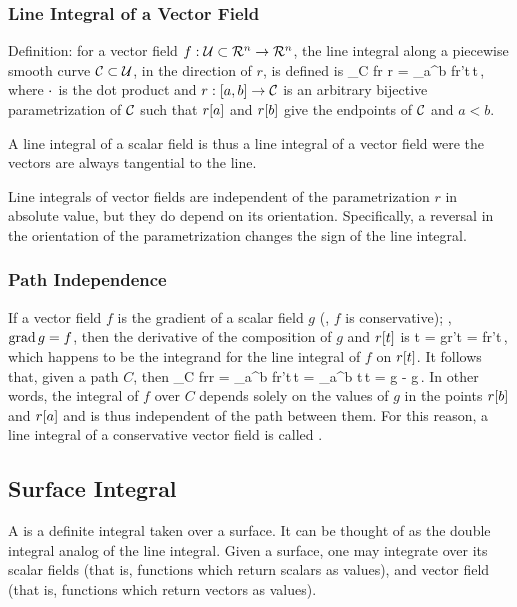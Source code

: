 \subsubsection{Line Integral of a Vector Field}
Definition: for a vector field ${f}:{\mathcal{U}\subset\mathcal{R}^{n}}\to{\mathcal{R}^{n}}$, the line integral along a piecewise smooth curve $\mathcal{C}\subset\mathcal{U}$, in the direction of $r$, is defined is
\beq
\int_C f\vat r \iprod\dx r = \int_a^b f\iprod r'\vat t\,\dx t\,,
\eeq
where $\operatorname{\cdot}$ is the dot product and ${r}:{[a,b]}\to{\mathcal{C}}$ is an arbitrary bijective parametrization of $\mathcal{C}$ such that $r\!\left[{a}\right]$ and $r\!\left[{b}\right]$ give the endpoints of $\mathcal{C}$ and $a < b$.

A line integral of a scalar field is thus a line integral of a vector field were the vectors are always tangential to the line.

Line integrals of vector fields are independent of the parametrization $r$ in absolute value, but they do depend on its orientation. Specifically, a reversal in the orientation of the parametrization changes the sign of the line integral.


\subsubsection{Path Independence}
If a vector field $f$ is the gradient of a scalar field $g$ (\ie, $f$ is conservative); \ie, $\operatorname{grad} g = f$, then the derivative of the composition of $g$ and $r\!\left[{t}\right]$ is
\beq
{}t = \grad g\iprod r'\vat t = f\iprod r'\vat t\,,
\eeq
which happens to be the integrand for the line integral of $f$ on $r\!\left[{t}\right]$. It follows that, given a path $C$, then
\beq
\int_C f\vat r\iprod\dx r = \int_a^b f\iprod r'\vat t\,\dx t 
    = \int_a^b t\,\dx t
    = g - g\,.
\eeq
In other words, the integral of $f$ over $C$ depends solely on the values of $g$ in the points $r\!\left[{b}\right]$ and $r\!\left[{a}\right]$ and is thus independent of the path between them. For this reason, a line integral of a conservative vector field is called .


\subsection{Surface Integral}
A  is a definite integral taken over a surface. It can be thought of as the double integral analog of the line integral. Given a surface, one may integrate over its scalar fields (that is, functions which return scalars as values), and vector field (that is, functions which return vectors as values).

